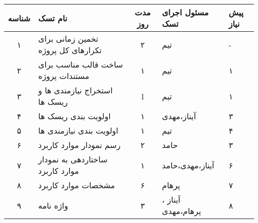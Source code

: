 
\begin{table}[H]
    \centering
    \begin{tabular}{|c|l|c|l|l|} \hline
        شناسه & نام تسک & مدت روز & مسئول اجرای تسک & پیش نیاز \\\hline
        ۱ & تخمین زمانی برای تکرارهای کل پروژه & ۲ & تیم & - \\\hline
        ۲ & ساخت قالب مناسب برای مستندات پروژه & ۱ & تیم & ۱ \\\hline
        ۳ & استخراج نیازمندی ها و ریسک ها & 1 & تیم & ۱ \\\hline
        ۴ & اولویت بندی ریسک ها & ۱ & آیناز،مهدی & ۳ \\\hline
        ۵ & اولویت بندی نیازمندی ها & ۱ & تیم & ۴ \\\hline
        ۶ & رسم نمودار موارد کاربرد & ۲ & حامد & ۳ \\\hline
        ۷ & ساختاردهی به نمودار موارد کاربرد & ۱ & آیناز،مهدی،حامد & ۶ \\\hline
        ۸ & مشخصات موارد کاربرد & ۶ & پرهام & ۷ \\\hline
        ۹ & واژه نامه & ۳ & آیناز ، پرهام،مهدی & ۸ \\\hline
        
    \end{tabular}
\end{table}

